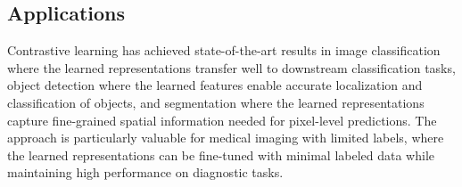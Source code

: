 \subsection{Applications}

Contrastive learning has achieved state-of-the-art results in image classification where the learned representations transfer well to downstream classification tasks, object detection where the learned features enable accurate localization and classification of objects, and segmentation where the learned representations capture fine-grained spatial information needed for pixel-level predictions. The approach is particularly valuable for medical imaging with limited labels, where the learned representations can be fine-tuned with minimal labeled data while maintaining high performance on diagnostic tasks.





